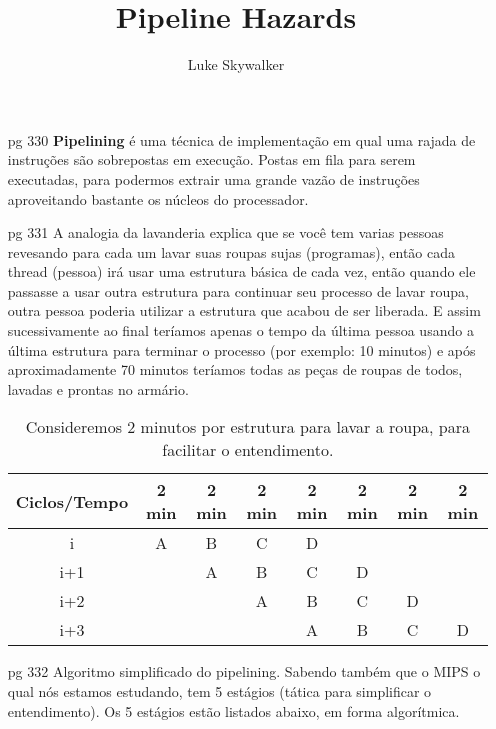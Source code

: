 \documentclass{article}
\author{Luke Skywalker}
\title{Pipeline Hazards}
\begin{document}
\maketitle

\begin{enumerate}
\item[pg 330] \textbf{Pipelining} é uma técnica de implementação em qual uma 
rajada de instruções são sobrepostas em execução. Postas em fila para serem 
executadas, para podermos extrair uma grande vazão de instruções aproveitando 
bastante os núcleos do processador.
\item[pg 331] A analogia da lavanderia explica que se você tem varias pessoas
revesando para cada um lavar suas roupas sujas (programas), então cada thread
(pessoa) irá usar uma estrutura básica de cada vez, então quando ele passasse a
usar outra estrutura para continuar seu processo de lavar roupa, outra pessoa
poderia utilizar a estrutura que acabou de ser liberada. E assim sucessivamente
ao final teríamos apenas o tempo da última pessoa usando a última estrutura 
para terminar o processo (por exemplo: 10 minutos) e após aproximadamente 70 
minutos teríamos todas as peças de roupas de todos, lavadas e prontas no 
armário.\\

\begin{table}[ht!]
  \centering
    \begin{tabular}{|c|c|c|c|c|c|c|c|}
      \hline Ciclos/Tempo & 2 min
                          & 2 min
                          & 2 min
                          & 2 min
                          & 2 min
                          & 2 min
                          & 2 min \\
      \hline i   & A & B & C & D &   &   &   \\
      \hline i+1 &   & A & B & C & D &   &   \\
      \hline i+2 &   &   & A & B & C & D &   \\
      \hline i+3 &   &   &   & A & B & C & D \\
      \hline
    \end{tabular}
  \caption{Consideremos 2 minutos por estrutura para lavar a roupa, para 
  facilitar o entendimento.}
\end{table}

\item[pg 332] Algoritmo simplificado do pipelining. Sabendo também que o MIPS o 
qual nós estamos estudando, tem 5 estágios (tática para simplificar o 
entendimento). Os 5 estágios estão listados abaixo, em forma algorítmica.


\end{enumerate}
\end{document}
